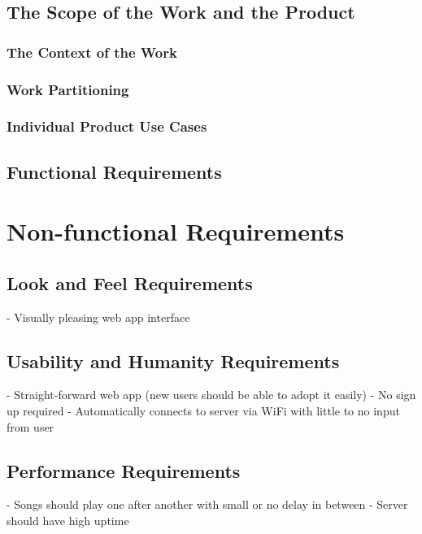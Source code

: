 \documentclass[12pt, titlepage]{article}
\begin{document}
\subsection{The Scope of the Work and the Product}

\subsubsection{The Context of the Work}

\subsubsection{Work Partitioning}

\subsubsection{Individual Product Use Cases}

\subsection{Functional Requirements}

\section{Non-functional Requirements}

\subsection{Look and Feel Requirements}

- Visually pleasing web app interface

\subsection{Usability and Humanity Requirements}

- Straight-forward web app (new users should be able to adopt it easily)
- No sign up required
- Automatically connects to server via WiFi with little to no input from user

\subsection{Performance Requirements}

- Songs should play one after another with small or no delay in between
- Server should have high uptime
\end{document}
